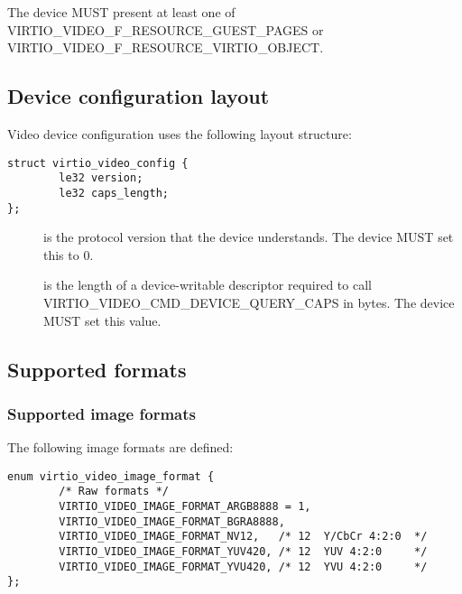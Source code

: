 
The device MUST present at least one of VIRTIO_VIDEO_F_RESOURCE_GUEST_PAGES or
VIRTIO_VIDEO_F_RESOURCE_VIRTIO_OBJECT.

\subsection{Device configuration layout}
\label{sec:Device Types / Video Device / Device configuration layout}

Video device configuration uses the following layout structure:

\begin{lstlisting}
struct virtio_video_config {
        le32 version;
        le32 caps_length;
};
\end{lstlisting}

\begin{description}
\item[] is the protocol version that the device understands. The
  device MUST set this to 0.
\item[] is the length of a device-writable descriptor
  required to call VIRTIO_VIDEO_CMD_DEVICE_QUERY_CAPS in bytes. The device MUST
  set this value.
\end{description}

\subsection{Supported formats}

\subsubsection{Supported image formats}

The following image formats are defined:
\begin{lstlisting}
enum virtio_video_image_format {
        /* Raw formats */
        VIRTIO_VIDEO_IMAGE_FORMAT_ARGB8888 = 1,
        VIRTIO_VIDEO_IMAGE_FORMAT_BGRA8888,
        VIRTIO_VIDEO_IMAGE_FORMAT_NV12,   /* 12  Y/CbCr 4:2:0  */
        VIRTIO_VIDEO_IMAGE_FORMAT_YUV420, /* 12  YUV 4:2:0     */
        VIRTIO_VIDEO_IMAGE_FORMAT_YVU420, /* 12  YVU 4:2:0     */
};
\end{lstlisting}

